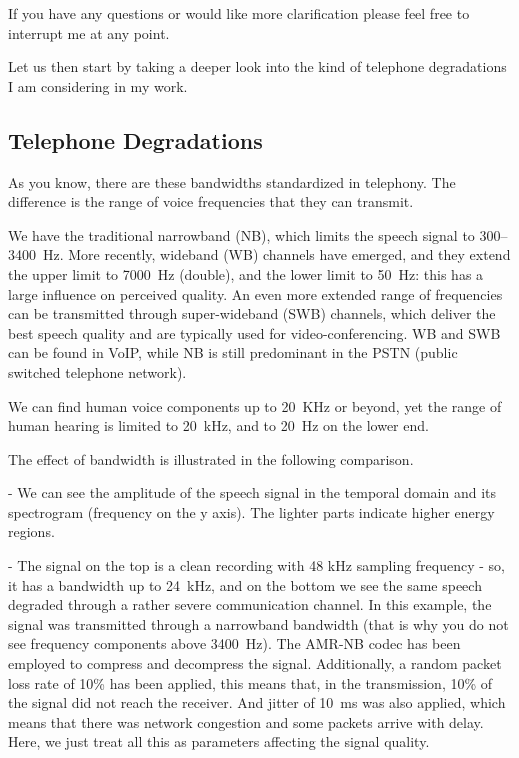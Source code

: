 \documentclass[a4paper]{article}
\begin{document}
If you have any questions or would like more clarification please feel free to interrupt me at any point.

Let us then start by taking a deeper look into the kind of telephone degradations I am considering in my work.



\subsection{Telephone Degradations}

As you know, there are these bandwidths standardized in telephony. The difference is the range of voice frequencies that they can transmit. 

We have the traditional narrowband (NB), which limits the speech signal to 300--3400~Hz. More recently, wideband (WB) channels have emerged, and they extend the upper limit to 7000~Hz (double), and the lower limit to 50~Hz: this has a large influence on perceived quality. An even more extended range of frequencies can be transmitted through super-wideband (SWB) channels, which deliver the best speech quality and are typically used for video-conferencing. WB and SWB can be found in VoIP, while NB is still predominant in the PSTN (public switched telephone network).

We can find human voice components up to 20~KHz or beyond, yet the range of human hearing is limited to 20~kHz, and to 20~Hz on the lower end.

The effect of bandwidth is illustrated in the following comparison. 

- We can see the amplitude of the speech signal in the temporal domain and its spectrogram (frequency on the y axis). The lighter parts indicate higher energy regions. 

- The signal on the top is a clean recording with 48 kHz sampling frequency - so, it has a bandwidth up to 24~kHz, and on the bottom we see the same speech degraded through a rather severe communication channel. In this example, the signal was transmitted through a narrowband bandwidth (that is why you do not see frequency components above 3400~Hz). The AMR-NB codec has been employed to compress and decompress the signal. Additionally, a random packet loss rate of 10\% has been applied, this means that, in the transmission, 10\% of the signal did not reach the receiver. And jitter of 10~ms was also applied, which means that there was network congestion and some packets arrive with delay. Here, we just treat all this as parameters affecting the signal quality.
\end{document}
